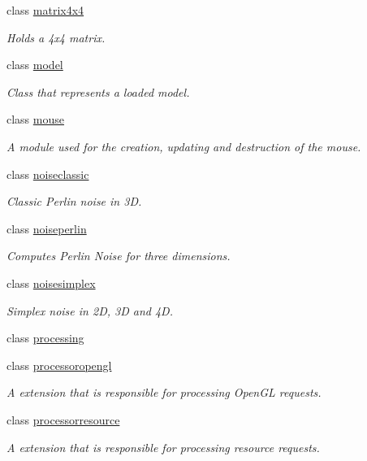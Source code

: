 \begin{DoxyCompactItemize}
class \hyperlink{classflounder_1_1matrix4x4}{matrix4x4}
\begin{DoxyCompactList}\small\item\em Holds a 4x4 matrix. \end{DoxyCompactList}\item 
class \hyperlink{classflounder_1_1model}{model}
\begin{DoxyCompactList}\small\item\em Class that represents a loaded model. \end{DoxyCompactList}\item 
class \hyperlink{classflounder_1_1mouse}{mouse}
\begin{DoxyCompactList}\small\item\em A module used for the creation, updating and destruction of the mouse. \end{DoxyCompactList}\item 
class \hyperlink{classflounder_1_1noiseclassic}{noiseclassic}
\begin{DoxyCompactList}\small\item\em Classic Perlin noise in 3D. \end{DoxyCompactList}\item 
class \hyperlink{classflounder_1_1noiseperlin}{noiseperlin}
\begin{DoxyCompactList}\small\item\em Computes Perlin Noise for three dimensions. \end{DoxyCompactList}\item 
class \hyperlink{classflounder_1_1noisesimplex}{noisesimplex}
\begin{DoxyCompactList}\small\item\em Simplex noise in 2D, 3D and 4D. \end{DoxyCompactList}\item 
class \hyperlink{classflounder_1_1processing}{processing}
\item 
class \hyperlink{classflounder_1_1processoropengl}{processoropengl}
\begin{DoxyCompactList}\small\item\em A extension that is responsible for processing Open\+GL requests. \end{DoxyCompactList}\item 
class \hyperlink{classflounder_1_1processorresource}{processorresource}
\begin{DoxyCompactList}\small\item\em A extension that is responsible for processing resource requests. \end{DoxyCompactList}\item 

\end{DoxyCompactItemize}
